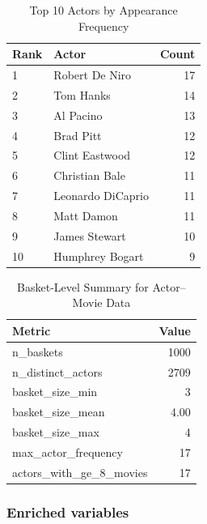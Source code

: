 \documentclass{article}  %
\begin{document}
\begin{table}[!htbp]
    \caption{Top 10 Actors by Appearance Frequency}
    \centering
    \begin{tabular}{llr}
        \toprule
        \textbf{Rank} & \textbf{Actor} & \textbf{Count} \\
        \midrule
        1  & Robert De Niro      & 17 \\
        2  & Tom Hanks           & 14 \\
        3  & Al Pacino           & 13 \\
        4  & Brad Pitt           & 12 \\
        5  & Clint Eastwood      & 12 \\
        6  & Christian Bale      & 11 \\
        7  & Leonardo DiCaprio   & 11 \\
        8  & Matt Damon          & 11 \\
        9  & James Stewart       & 10 \\
        10 & Humphrey Bogart     & 9 \\       
        \bottomrule
    \end{tabular}
    \label{tab:5}
\end{table}
\begin{table}[!htbp]
    \caption{Basket-Level Summary for Actor--Movie Data}
    \centering
    \begin{tabular}{p{}r}
        \toprule
        \textbf{Metric} & \textbf{Value} \\
        \midrule
        n\_baskets & 1000 \\
        n\_distinct\_actors & 2709 \\
        basket\_size\_min & 3 \\
        basket\_size\_mean & 4.00 \\
        basket\_size\_max & 4 \\
        max\_actor\_frequency & 17 \\
        actors\_with\_ge\_8\_movies & 17 \\
        \bottomrule
    \end{tabular}
    \label{tab:6}
\end{table}


\FloatBarrier

\subsubsection{Enriched variables}
\end{document}
